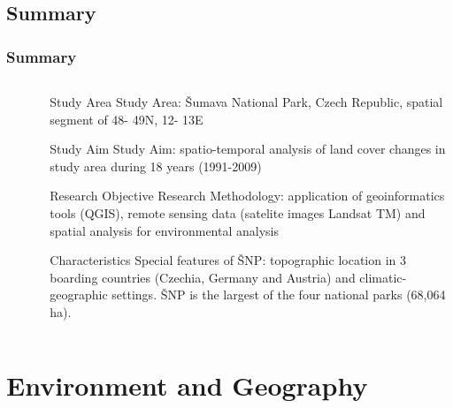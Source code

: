 \documentclass[pdflatex,compress,8pt,
	xcolor={dvipsnames,dvipsnames,svgnames,x11names,table},
	hyperref={
	breaklinks = true, 
	pdfauthor={Lemenkova Polina}, 
	pdfsubject={Preentation}, 
	pdfcreator={Lemenkova Polina}, 
	pdfproducer={Lemenkova Polina}, 
	colorlinks=true,linkcolor=blue, 
	citecolor=NavyBlue, 
	urlcolor = NavyBlue, 
	breaklinks = true}]{beamer}
\begin{document}
\subsection{Summary}
\begin{frame}\frametitle{Summary}
\begin{minipage}[0.4\textheight]{\textwidth}
\begin{columns}[T]
\begin{column}{0.4\textwidth}
\vspace{1em}

\begin{figure}[H]
	\centering
			\vspace{2mm}
\end{figure}

\end{column}
\begin{column}{0.6\textwidth}
\vspace{1em} 
\begin{alertblock}{Study Area}
Study Area: Šumava National Park, Czech Republic, spatial segment of 48\degree - 49\degree N, 12\degree - 13\degree E
\end{alertblock}

\begin{block}{Study Aim}
Study Aim: spatio-temporal analysis of land cover changes in study area during 18 years (1991-2009)
\end{block}

\begin{examples}{Research Objective}
Research Methodology: application of geoinformatics tools (QGIS), remote sensing data (satelite images Landsat TM) and spatial analysis for environmental analysis
\end{examples}

\begin{block}{Characteristics}
Special features of ŠNP: topographic location in 3 boarding countries (Czechia, Germany and Austria) and climatic-geographic settings. ŠNP is the largest of the four national parks (68,064 ha).
\end{block}

\end{column}
\end{columns}
\end{minipage}
\end{frame}

\section{Environment and Geography}
\end{document}
